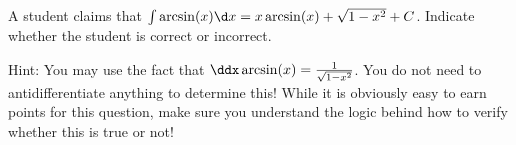 \documentclass{ximera}
\author{Jim Talamo}
\begin{document}
\begin{exercise}
A student claims that $\int \arcsin(x) \d x = x \arcsin(x) + \sqrt{1-x^2}+C$.  Indicate whether the student is correct or incorrect. 

\begin{multipleChoice}  
\end{multipleChoice}

Hint: You may use the fact that $\ddx \arcsin(x) = \frac{1}{\sqrt{1-x^2}}$.  You do not need to antidifferentiate anything to determine this!   While it is obviously easy to earn points for this question, make sure you understand the logic behind how to verify whether this is true or not!
\end{exercise}
\end{document}
